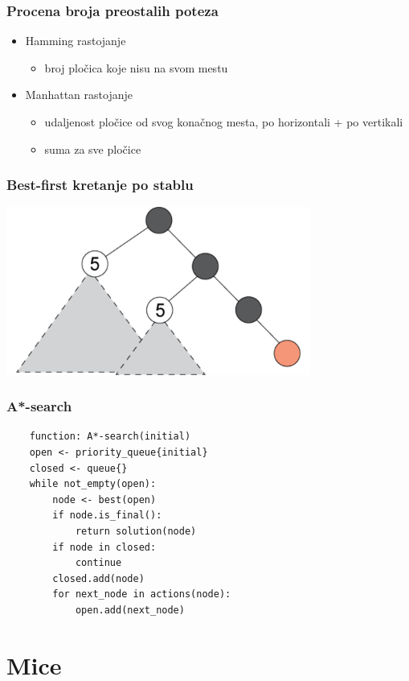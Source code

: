 \documentclass[compress,aspectratio=169]{beamer}
\begin{document}
\begin{frame}[fragile]
  \frametitle{Procena broja preostalih poteza}
  \begin{itemize}
    \item Hamming rastojanje
    \begin{itemize}
      \item broj pločica koje nisu na svom mestu
    \end{itemize}
    \item Manhattan rastojanje
    \begin{itemize}
      \item udaljenost pločice od svog konačnog mesta, po horizontali + po vertikali
      \item suma za sve pločice
    \end{itemize}
  \end{itemize}
\end{frame}

\begin{frame}[fragile]
  \frametitle{Best-first kretanje po stablu}
  \begin{center}
    \includegraphics[width=10cm]{prj-01-pic06.png}
  \end{center}
\end{frame}

\begin{frame}[fragile]
  \frametitle{A*-search}
  \begin{verbatim}
    function: A*-search(initial)
    open <- priority_queue{initial}
    closed <- queue{}
    while not_empty(open):
        node <- best(open)
        if node.is_final():
            return solution(node)
        if node in closed:
            continue
        closed.add(node)
        for next_node in actions(node):
            open.add(next_node)    
  \end{verbatim}
\end{frame}

\section{Mice}
\end{document}

